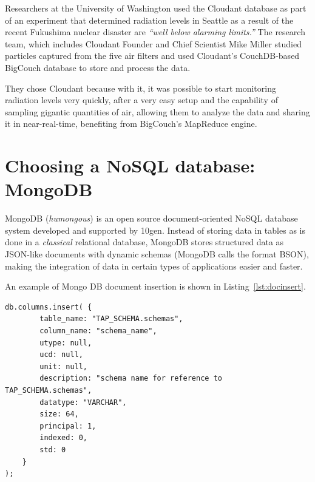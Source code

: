 Researchers at the University of Washington used the Cloudant  database as part of an experiment that determined radiation levels in Seattle as a result of the recent Fukushima nuclear disaster are \emph{``well below alarming limits.''} The research team, which includes Cloudant Founder and Chief Scientist Mike Miller studied particles captured from the five air filters and used Cloudant’s CouchDB-based BigCouch database to store and process the data.

They chose Cloudant because with it, it was possible to start monitoring radiation levels very quickly, after a very easy setup and the capability of sampling gigantic quantities of air, allowing them to analyze the data and sharing it in near-real-time,
benefiting from BigCouch's MapReduce engine.





\section{Choosing a NoSQL database: MongoDB} %
\label{sec:mongodb_a_document_oriented_database}

MongoDB (\emph{humongous}) is an open source document-oriented
NoSQL
database system developed and supported by 10gen.
Instead of storing data in tables as is done in a \emph{classical} relational database, MongoDB stores structured data as JSON-like documents with dynamic schemas (MongoDB calls the format BSON), making the integration of data in certain types of applications easier and faster. 

An example of Mongo DB document insertion is shown in Listing~\ref{lst:docinsert}.

\begin{lstlisting}[float,label=lst:docinsert,caption=MongoDB column insertion example in JSON]
db.columns.insert( {
		table_name: "TAP_SCHEMA.schemas",
		column_name: "schema_name",
		utype: null,
		ucd: null,
		unit: null,
		description: "schema name for reference to TAP_SCHEMA.schemas",
		datatype: "VARCHAR",
		size: 64,
		principal: 1,
		indexed: 0,
		std: 0
	}
);
\end{lstlisting} 


